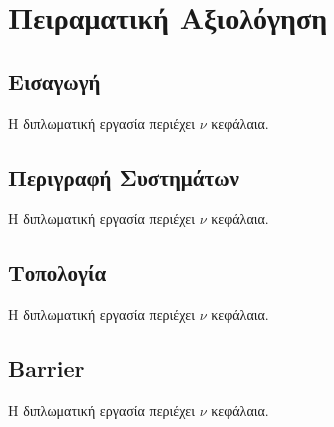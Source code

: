 \chapter{Πειραματική Αξιολόγηση}
\label{ch:Experimental Evaluation}

\section{Εισαγωγή}
\label{sec:Introduction}
Η διπλωματική εργασία περιέχει $\nu$ κεφάλαια.

\section{Περιγραφή Συστημάτων}
\label{sec:Systems Description}
Η διπλωματική εργασία περιέχει $\nu$ κεφάλαια.

\section{Τοπολογία}
\label{sec:Topology}
Η διπλωματική εργασία περιέχει $\nu$ κεφάλαια.

\section{Barrier}
\label{sec:Barrier}
Η διπλωματική εργασία περιέχει $\nu$ κεφάλαια.
